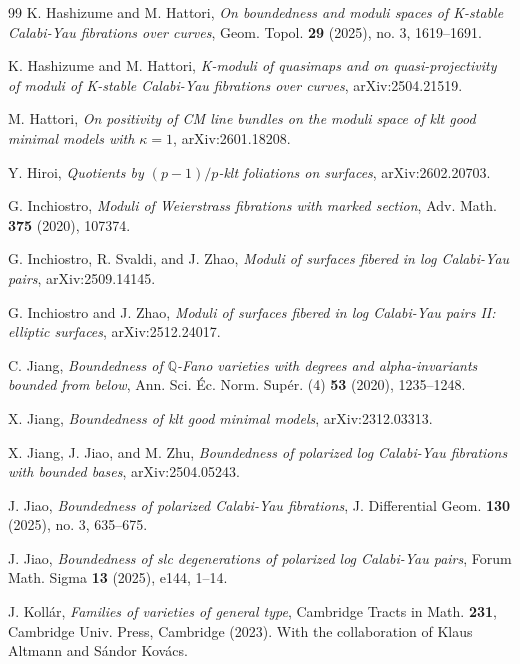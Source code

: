 \documentclass[11pt,reqno]{amsart}
\numberwithin{equation}{section}
\theoremstyle{definition}
\begin{document}
\begin{thebibliography}{99}
 K. Hashizume and M. Hattori, \textit{On boundedness and moduli spaces of K-stable Calabi-Yau fibrations over curves}, Geom. Topol. \textbf{29} (2025), no. 3, 1619--1691.

 K. Hashizume and M. Hattori, \textit{K-moduli of quasimaps and on quasi-projectivity of moduli of K-stable Calabi-Yau fibrations over curves}, arXiv:2504.21519.

 M. Hattori, \textit{On positivity of CM line bundles on the moduli space of klt good minimal models with $\kappa=1$}, arXiv:2601.18208.

 Y. Hiroi, \textit{Quotients by $(p-1)/p$-klt foliations on surfaces}, arXiv:2602.20703.

 G. Inchiostro, \textit{Moduli of Weierstrass fibrations with marked section}, Adv. Math. \textbf{375} (2020), 107374.

 G. Inchiostro, R. Svaldi, and J. Zhao, \textit{Moduli of surfaces fibered in log Calabi-Yau pairs}, arXiv:2509.14145.

 G. Inchiostro and J. Zhao, \textit{Moduli of surfaces fibered in log Calabi-Yau pairs II: elliptic surfaces}, arXiv:2512.24017.

 C. Jiang, \textit{Boundedness of $\mathbb Q$-Fano varieties with degrees and alpha-invariants bounded from below}, Ann. Sci. \'Ec. Norm. Sup\'er. (4) \textbf{53} (2020), 1235--1248.

 X. Jiang, \textit{Boundedness of klt good minimal models}, arXiv:2312.03313.

 X. Jiang, J. Jiao, and M. Zhu, \textit{Boundedness of polarized log Calabi-Yau fibrations with bounded bases}, arXiv:2504.05243.

 J. Jiao, \textit{Boundedness of polarized Calabi-Yau fibrations}, J. Differential Geom. \textbf{130} (2025), no. 3, 635--675.

 J. Jiao, \textit{Boundedness of slc degenerations of polarized log Calabi-Yau pairs}, Forum Math. Sigma \textbf{13} (2025), e144, 1--14.

 J. Koll\'ar, \textit{Families of varieties of general type}, Cambridge Tracts in Math. \textbf{231}, Cambridge Univ. Press, Cambridge (2023). With the collaboration of Klaus Altmann and S\'andor Kov\'acs.


\end{thebibliography}
\end{document}
